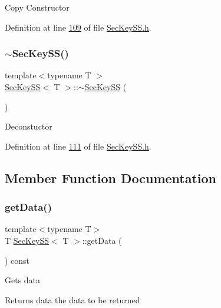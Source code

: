 Copy Constructor 

Definition at line \hyperlink{SecKeySS_8h_source_l00109}{109} of file \hyperlink{SecKeySS_8h_source}{Sec\+Key\+S\+S.\+h}.

\mbox{\label{classSecKeySS_ada9aac8a98536f84b46bc04b7acf9fec}} 
\subsubsection{\texorpdfstring{$\sim$\+Sec\+Key\+S\+S()}{~SecKeySS()}}
{\footnotesize\ttfamily template$<$typename T $>$ \\
\hyperlink{classSecKeySS}{Sec\+Key\+SS}$<$ T $>$\+::$\sim$\hyperlink{classSecKeySS}{Sec\+Key\+SS} (\begin{DoxyParamCaption}{ }\end{DoxyParamCaption})}

Deconstuctor 

Definition at line \hyperlink{SecKeySS_8h_source_l00111}{111} of file \hyperlink{SecKeySS_8h_source}{Sec\+Key\+S\+S.\+h}.



\subsection{Member Function Documentation}
\mbox{\label{classSecKeySS_a9fdb8a771250b7aaab556f019b381eab}} 
\subsubsection{\texorpdfstring{get\+Data()}{getData()}}
{\footnotesize\ttfamily template$<$typename T$>$ \\
T \hyperlink{classSecKeySS}{Sec\+Key\+SS}$<$ T $>$\+::get\+Data (\begin{DoxyParamCaption}{ }\end{DoxyParamCaption}) const\hspace{0.3cm}{\ttfamily [inline]}}

Gets data \begin{DoxyReturn}{Returns}
data the data to be returned 
\end{DoxyReturn}


